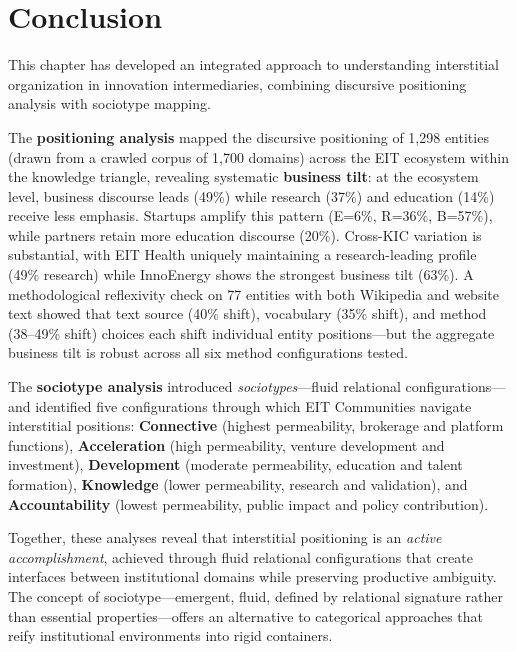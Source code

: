\documentclass[../main.tex]{subfiles}
\begin{document}
\section{Conclusion}

This chapter has developed an integrated approach to understanding interstitial organization in innovation intermediaries, combining discursive positioning analysis with sociotype mapping.

The \textbf{positioning analysis} mapped the discursive positioning of 1,298
entities (drawn from a crawled corpus of 1,700 domains) across the EIT ecosystem
within the knowledge triangle, revealing systematic \textbf{business tilt}: at
the ecosystem level, business discourse leads (49\%) while research (37\%) and
education (14\%) receive less emphasis. Startups amplify this pattern
(E=6\%, R=36\%, B=57\%), while partners retain more education discourse (20\%).
Cross-KIC variation is substantial, with EIT Health uniquely maintaining a
research-leading profile (49\% research) while InnoEnergy shows the strongest
business tilt (63\%). A methodological reflexivity check on 77 entities with
both Wikipedia and website text showed that text source (40\% shift), vocabulary
(35\% shift), and method (38--49\% shift) choices each shift individual entity
positions---but the aggregate business tilt is robust across all six method
configurations tested.

The \textbf{sociotype analysis} introduced \textit{sociotypes}---fluid relational configurations---and identified five configurations through which EIT Communities navigate interstitial positions: \textbf{Connective} (highest permeability, brokerage and platform functions), \textbf{Acceleration} (high permeability, venture development and investment), \textbf{Development} (moderate permeability, education and talent formation), \textbf{Knowledge} (lower permeability, research and validation), and \textbf{Accountability} (lowest permeability, public impact and policy contribution).

Together, these analyses reveal that interstitial positioning is an \textit{active accomplishment}, achieved through fluid relational configurations that create interfaces between institutional domains while preserving productive ambiguity. The concept of sociotype---emergent, fluid, defined by relational signature rather than essential properties---offers an alternative to categorical approaches that reify institutional environments into rigid containers.
\end{document}
